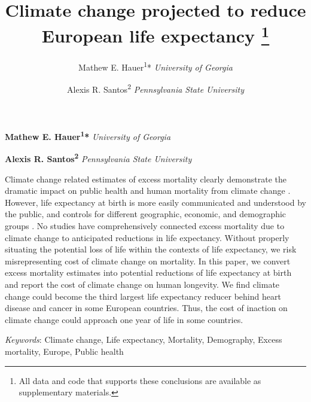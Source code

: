 \documentclass[12pt,]{article}
\title{Climate change projected to reduce European life expectancy \thanks{All data and code that supports these conclusions are available as
supplementary materials.}  }
\author{\Large Mathew E. Hauer\textsuperscript{1}*\vspace{0.05in} \newline\normalsize\emph{University of Georgia}   \and \Large Alexis R. Santos\textsuperscript{2}\vspace{0.05in} \newline\normalsize\emph{Pennsylvania State University}  }
\date{}
\newcommand*{\authorfont}{\fontfamily{phv}\selectfont}
\renewenvironment{abstract}
 {{%
    \setlength{\leftmargin}{0mm}
    \setlength{\rightmargin}{\leftmargin}%
  }%
  \relax}
 {\endlist}
\begin{document}
	
%

{%
\setlength{\parindent}{0pt}
\thispagestyle{plain}
{\fontsize{18}{20}\selectfont\raggedright 
\maketitle  %

}

{
   \vskip 13.5pt\relax \normalsize\fontsize{11}{12} 
\textbf{\authorfont Mathew E. Hauer\textsuperscript{1}*} \hskip 15pt \emph{\small University of Georgia}   \par \textbf{\authorfont Alexis R. Santos\textsuperscript{2}} \hskip 15pt \emph{\small Pennsylvania State University}   

}

}








\begin{abstract}

    \hbox{\vrule height .2pt width 39.14pc}

    \vskip 8.5pt %

\noindent Climate change related estimates of excess mortality clearly demonstrate
the dramatic impact on public health and human mortality from climate
change
\citep{patz2005impact, aastrom2013attributing, forzieri2017increasing, staddon2014climate}.
However, life expectancy at birth is more easily communicated and
understood by the public, and controls for different geographic,
economic, and demographic groups \citep{parrish2010peer}. No studies
have comprehensively connected excess mortality due to climate change to
anticipated reductions in life expectancy. Without properly situating
the potential loss of life within the contexts of life expectancy, we
risk misrepresenting cost of climate change on mortality. In this paper,
we convert excess mortality estimates into potential reductions of life
expectancy at birth and report the cost of climate change on human
longevity. We find climate change could become the third largest life
expectancy reducer behind heart disease and cancer in some European
countries. Thus, the cost of inaction on climate change could approach
one year of life in some countries.


\vskip 8.5pt \noindent \emph{Keywords}: Climate change, Life expectancy, Mortality, Demography, Excess
mortality, Europe, Public health \par

    \hbox{\vrule height .2pt width 39.14pc}



\end{abstract}
\end{document}
